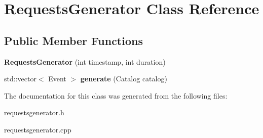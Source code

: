 \hypertarget{class_requests_generator}{}\section{Requests\+Generator Class Reference}
\label{class_requests_generator}
\subsection*{Public Member Functions}
\begin{DoxyCompactItemize}
\item 
{\bfseries Requests\+Generator} (int timestamp, int duration)\hypertarget{class_requests_generator_acaf8ef7ce01c37b6dec11feefefd6e4b}{}\label{class_requests_generator_acaf8ef7ce01c37b6dec11feefefd6e4b}

\item 
std\+::vector$<$ Event $>$ {\bfseries generate} (Catalog catalog)\hypertarget{class_requests_generator_a4cc136903f250e46ba5d9c381ad90978}{}\label{class_requests_generator_a4cc136903f250e46ba5d9c381ad90978}

\end{DoxyCompactItemize}


The documentation for this class was generated from the following files\+:\begin{DoxyCompactItemize}
\item 
requestsgenerator.\+h\item 
requestsgenerator.\+cpp\end{DoxyCompactItemize}
